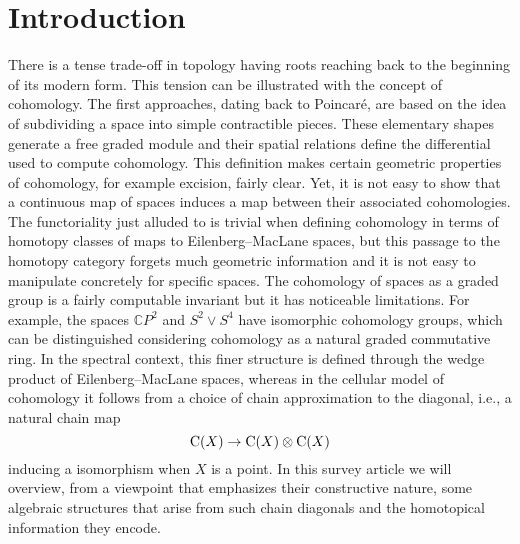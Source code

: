 
\section{Introduction} \label{s:introduction}

There is a tense trade-off in topology having roots reaching back to the beginning of its modern form.
This tension can be illustrated with the concept of cohomology.
The first approaches, dating back to Poincar\'e, are based on the idea of subdividing a space into simple contractible pieces.
These elementary shapes generate a free graded module and their spatial relations define the differential used to compute cohomology.
This definition makes certain geometric properties of cohomology, for example excision, fairly clear.
Yet, it is not easy to show that a continuous map of spaces induces a map between their associated cohomologies.
The functoriality just alluded to is trivial when defining cohomology in terms of homotopy classes of maps to Eilenberg--MacLane spaces, but this passage to the homotopy category forgets much geometric information and it is not easy to manipulate concretely for specific spaces.
The cohomology of spaces as a graded group is a fairly computable invariant but it has noticeable limitations.
For example, the spaces $\mathbb{C} P^2$ and $S^2 \vee S^4$ have isomorphic cohomology groups, which can be distinguished considering cohomology as a natural graded commutative ring.
In the spectral context, this finer structure is defined through the wedge product of Eilenberg--MacLane spaces, whereas in the cellular model of cohomology it follows from a choice of chain approximation to the diagonal, i.e., a natural chain map
\[
\operatorname{C}(X) \to \operatorname{C}(X) \otimes \operatorname{C}(X)
\]
inducing a isomorphism when $X$ is a point.
In this survey article we will overview, from a viewpoint that emphasizes their constructive nature, some algebraic structures that arise from such chain diagonals and the homotopical information they encode.

